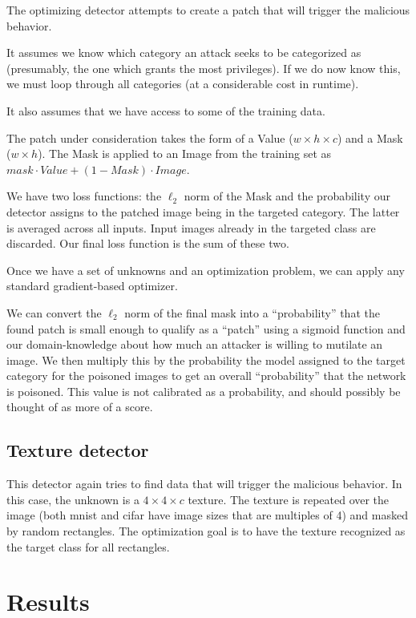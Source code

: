 \documentclass[letterpaper, 10 pt, conference]{ieeeconf}  %
\begin{document}
The optimizing detector attempts to create a patch that will trigger
the malicious behavior.

It assumes we know which category an attack
seeks to be categorized as (presumably, the one which grants the most
privileges).  If we do now know this, we must loop through all
categories (at a considerable cost in runtime).

It also assumes that we have access to some of the training data.

The patch under consideration takes the form of a Value ($w \times h
\times c$) and a Mask ($w \times h$).  The Mask is applied to an
Image from the training set as $mask \cdot Value + (1 - Mask) \cdot
Image$.

We have two loss functions: the $\ell_2$ norm of the Mask and the
probability our detector assigns to the patched image being in the
targeted category.  The latter is averaged across all inputs.  Input
images already in the targeted class are discarded.  Our final loss
function is the sum of these two.

Once we have a set of unknowns and an optimization problem, we can
apply any standard gradient-based optimizer.

We can convert the $\ell_2$ norm of the final mask into a ``probability''
that the found patch is small enough to qualify as a ``patch'' using a
sigmoid function and our domain-knowledge about how much an attacker
is willing to mutilate an image.  We then multiply this by the
probability the model assigned to the target category for the poisoned
images to get an overall ``probability'' that the network is
poisoned.  This value is not calibrated as a probability, and should
possibly be thought of as more of a score.


\subsection{Texture detector}


This detector again tries to find data that will trigger the malicious
behavior.  In this case, the unknown is a $4\times 4\times c$ texture.  The
texture is repeated over the image (both mnist and cifar have image
sizes that are multiples of 4) and masked by random rectangles.  The
optimization goal is to have the texture recognized as the target
class for all rectangles.

\section{Results}
\end{document}

